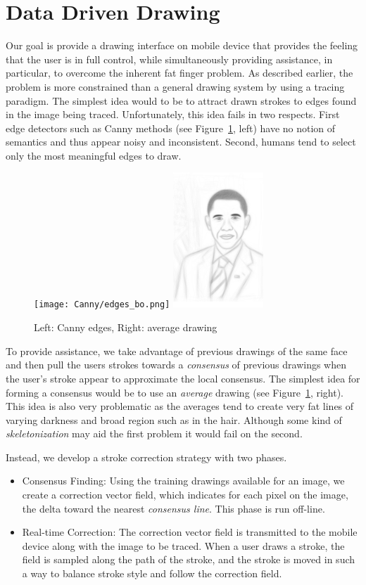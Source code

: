 \section{Data Driven Drawing}

Our goal is provide a drawing interface on mobile device that provides the feeling that the user is in full control, while simultaneously providing assistance, in particular, to overcome the inherent fat finger problem. As described earlier, the problem is more constrained than a general drawing system by using a tracing paradigm. The simplest idea would to be to attract drawn strokes to edges found in the image being traced. Unfortunately, this idea fails in two respects. First edge detectors such as Canny methods (see Figure~\ref{fig:edges}, left) have no notion of semantics and thus appear noisy and inconsistent. Second, humans tend to select only the most meaningful edges to draw.

\begin{figure}
  \centering%
\texttt{[image: Canny/edges\_bo.png]}
\hspace{0.1in}
\includegraphics[height=2in]{figures/imagetable/avg_bo.png}
  \caption{Left: Canny edges, Right: average drawing}
  \label{fig:edges}
\end{figure}

To provide assistance, we take advantage of previous drawings of the same face and then pull the users strokes towards a {\em consensus} of previous drawings when the user's stroke appear to approximate the local consensus. The simplest idea for forming a consensus would be to use an {\em average} drawing (see Figure~\ref{fig:edges}, right). This idea is also very problematic as the averages tend to create very fat lines of varying darkness and broad region such as in the hair. Although some kind of {\em skeletonization} may aid the first problem it would fail on the second.

Instead, we develop a stroke correction strategy with two phases.
\begin{itemize}
\item Consensus Finding: Using the training drawings available for an image, we create a correction vector field, which indicates for each pixel on the image, the delta toward the nearest {\em consensus line}.  This phase is run off-line.
\item Real-time Correction: The correction vector field is transmitted to the mobile device along with the image to be traced.  When a user draws a stroke, the field is sampled along the path of the stroke, and the stroke is moved in such a way to balance stroke style and follow the correction field.
\end{itemize}

